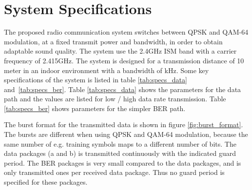 \section{System Specifications}
\label{sec:specifications}
The proposed radio communication system switches between QPSK and QAM-64 modulation, at a fixed transmit power and bandwidth, in order to obtain adaptable sound quality.  The system use the 2.4GHz ISM band with a carrier frequency of 2.415GHz. The system is designed for a transmission distance of 10 meter in an indoor environment with a bandwidth of \bw kHz. Some key specifications of the system is listed in table \ref{tab:specs_data} and \ref{tab:specs_ber}. Table \ref{tab:specs_data} shows the parameters for the data path and the values are listed for low / high data rate transmission. Table \ref{tab:specs_ber} shows parameters for the simpler BER path. 


The burst format for the transmitted data is shown in figure \ref{fig:burst_format}. The bursts are different when using QPSK and QAM-64 modulation, because the same number of e.g. training symbols maps to a different number of bits. The data packages (a and b) is transmitted continuously with the indicated guard period. The BER packages is very small compared to the data packages, and is only transmitted ones per received data package. Thus no guard period is specified for these packages. 
 